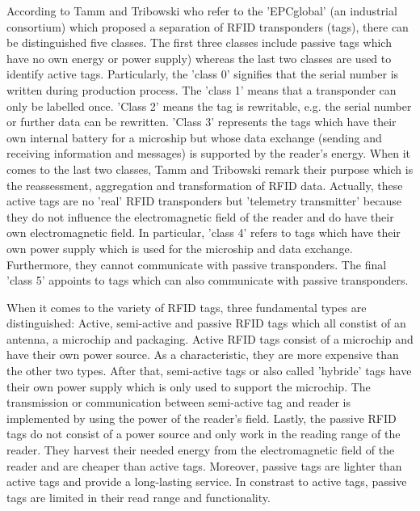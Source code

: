 According to Tamm and Tribowski \cite[p.15 ff.]{fokus} who refer to the 'EPCglobal' (an industrial consortium) which proposed a separation of RFID transponders (tags), there can be distinguished five classes. The first three classes include passive tags which have no own energy or power supply) whereas the last two classes are used to identify active tags. Particularly, the 'class 0' signifies that the serial number is written during production process. The 'class 1' means that a transponder can only be labelled once. 'Class 2' means the tag is rewritable, e.g. the serial number or further data can be rewritten. 'Class 3' represents the tags which have their own internal battery for a microship but whose data exchange (sending and receiving information and messages) is supported by the reader's energy. When it comes to the last two classes, Tamm and Tribowski remark their purpose which is the reassessment, aggregation and transformation of RFID data. Actually, these active tags are no 'real' RFID transponders but 'telemetry transmitter' because they do not influence the electromagnetic field of the reader and do have their own electromagnetic field. In particular, 'class 4' refers to tags which have their own power supply which is used for the microship and data exchange. Furthermore, they cannot communicate with passive transponders. The final 'class 5' appoints to tags which can also communicate with passive transponders. 

When it comes to the variety of RFID tags, three fundamental types are distinguished: Active, semi-active and passive RFID tags \cite{henrici} which all constist of an antenna, a microchip and packaging. Active RFID tags consist of a microchip and have their own power source. As a characteristic, they are more expensive than the other two types. After that, semi-active tags or also called 'hybride' tags have their own power supply which is only used to support the microchip. The transmission or communication between semi-active tag and reader is implemented by using the power of the reader's field. Lastly, the passive RFID tags do not consist of a power source and only work in the reading range of the reader. They harvest their needed energy from the electromagnetic field of the reader and are cheaper than active tags. Moreover, passive tags are lighter than active tags and provide a long-lasting service. In constrast to active tags, passive tags are limited in their read range and functionality.

